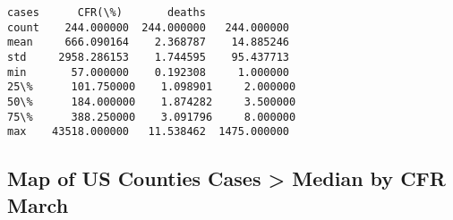 \documentclass[11pt]{article}
\makeatletter
\newcommand{\boxspacing}{\kern\kvtcb@left@rule\kern\kvtcb@boxsep}
\newcommand{\prompt}[4]{
        \ttfamily\llap{{\color{#2}[#3]:\hspace{3pt}#4}}\vspace{-\baselineskip}
    }
\makeatother
\begin{document}
            \begin{tcolorbox}[breakable, size=fbox, boxrule=.5pt, pad at break*=1mm, opacityfill=0]
\prompt{Out}{outcolor}{15}{\boxspacing}
\begin{Verbatim}[commandchars=\\\{\}]
              cases      CFR(\%)       deaths
count    244.000000  244.000000   244.000000
mean     666.090164    2.368787    14.885246
std     2958.286153    1.744595    95.437713
min       57.000000    0.192308     1.000000
25\%      101.750000    1.098901     2.000000
50\%      184.000000    1.874282     3.500000
75\%      388.250000    3.091796     8.000000
max    43518.000000   11.538462  1475.000000
\end{Verbatim}
\end{tcolorbox}
        
    \subsection{\texorpdfstring{\textbf{Map of US Counties Cases
\textgreater{} Median by CFR
March}}{Map of US Counties Cases \textgreater{} Median by CFR March}}\label{map-of-us-counties-cases-median-by-cfr-march}
\end{document}
